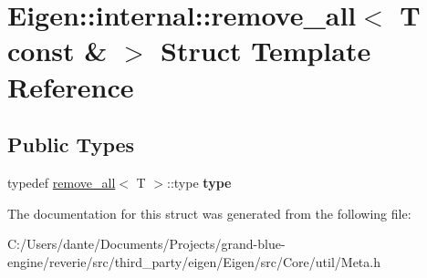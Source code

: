 \hypertarget{struct_eigen_1_1internal_1_1remove__all_3_01_t_01const_01_6_01_4}{}\section{Eigen\+::internal\+::remove\+\_\+all$<$ T const \& $>$ Struct Template Reference}
\label{struct_eigen_1_1internal_1_1remove__all_3_01_t_01const_01_6_01_4}
\subsection*{Public Types}
\begin{DoxyCompactItemize}
\item 
\mbox{\label{struct_eigen_1_1internal_1_1remove__all_3_01_t_01const_01_6_01_4_ad57977ae3c47c6738bd4c3d5d317cb5b}} 
typedef \mbox{\hyperlink{struct_eigen_1_1internal_1_1remove__all}{remove\+\_\+all}}$<$ T $>$\+::type {\bfseries type}
\end{DoxyCompactItemize}


The documentation for this struct was generated from the following file\+:\begin{DoxyCompactItemize}
\item 
C\+:/\+Users/dante/\+Documents/\+Projects/grand-\/blue-\/engine/reverie/src/third\+\_\+party/eigen/\+Eigen/src/\+Core/util/Meta.\+h\end{DoxyCompactItemize}
